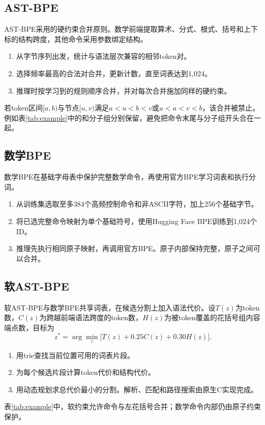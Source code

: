 \subsection{AST-BPE}
AST-BPE采用\citet{muller2019ast}的硬约束合并原则。数学前端提取算术、分式、根式、括号和上下标的结构跨度，其他命令采用参数绑定结构。
\begin{enumerate}
\item 从字节序列出发，统计与语法层次兼容的相邻token对。
\item 选择频率最高的合法对合并，更新计数，直至词表达到1,024。
\item 推理时按学习到的规则顺序合并，并对每次合并施加同样的硬约束。
\end{enumerate}
若token区间$[a,b)$与节点$[u,v)$满足$a<u<b<v$或$u<a<v<b$，该合并被禁止。例如表\ref{tab:example}中的\code{\frac}和分子组分别保留，避免把命令末尾与分子组开头合在一起。

\subsection{数学BPE}
数学BPE在基础字母表中保护完整数学命令，再使用官方BPE学习词表和执行分词。
\begin{enumerate}
\item 从训练集选取至多384个高频控制命令和非ASCII字符，加上256个基础字节。
\item 将已选完整命令映射为单个基础符号，使用Hugging Face BPE训练到1,024个ID。
\item 推理先执行相同原子映射，再调用官方BPE。原子内部保持完整，原子之间可以合并。
\end{enumerate}

\subsection{软AST-BPE}
软AST-BPE与数学BPE共享词表，在候选分割上加入语法代价。设$T(z)$为token数，$C(z)$为跨越前端语法跨度的token数，$H(z)$为被token覆盖的花括号组内容端点数，目标为
\begin{equation}\label{eq:soft}
z^*=\arg\min_z\bigl[T(z)+0.25C(z)+0.30H(z)\bigr].
\end{equation}
\begin{enumerate}
\item 用trie查找当前位置可用的词表片段。
\item 为每个候选片段计算token代价和结构代价。
\item 用动态规划求总代价最小的分割。解析、匹配和路径搜索由原生C实现完成。
\end{enumerate}
表\ref{tab:example}中，软约束允许命令与左花括号合并；数学命令内部仍由原子约束保护。


